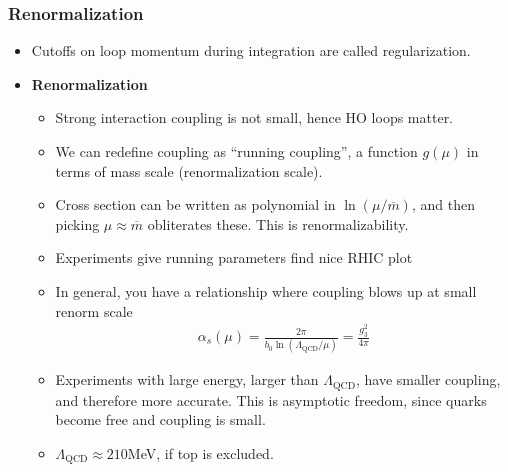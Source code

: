 \subsubsection{Renormalization}
\begin{itemize}
    \item Cutoffs on loop momentum during integration are called regularization. \cite{wells}
    \item \textbf{Renormalization} \cite{wells}
    \begin{itemize}
        \item Strong interaction coupling is not small, hence HO loops matter. \cite{wells}
        \item We can redefine coupling as ``running coupling'', a function $g(\mu)$ in terms of mass scale (renormalization scale). \cite{wells}
        \item Cross section can be written as polynomial in $\ln(\mu/\overline{m})$, and  then picking $\mu\approx\overline{m}$ obliterates these. This is renormalizability. \cite{wells}
        \item Experiments give running parameters {\color{red} find nice RHIC plot} \cite{wells}
        \item In general, you have a relationship where coupling blows up at small renorm scale \cite{wells}
        \begin{equation}\begin{split}
        \alpha_s(\mu)=\frac{2\pi}{b_0\ln(\Lambda_\text{QCD}/\mu)}=\frac{g^2_3}{4\pi}
        \end{split}\end{equation}
        \item Experiments with large energy, larger than $\Lambda_\text{QCD}$, have smaller coupling, and therefore more accurate. This is asymptotic freedom, since quarks become free and coupling is small. \cite{wells}
        \item $\Lambda_\text{QCD}\approx210$MeV, if top is excluded. \cite{wells}
    \end{itemize}
\end{itemize}

